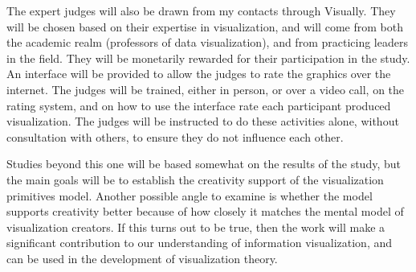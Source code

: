 The expert judges will also be drawn from my contacts through Visually.
They will be chosen based on their expertise in visualization, and will come from both the academic realm (professors of data visualization), and from practicing leaders in the field.
They will be monetarily rewarded for their participation in the study.
An interface will be provided to allow the judges to rate the graphics over the internet.
The judges will be trained, either in person, or over a video call, on the rating system, and on how to use the interface rate each participant produced visualization.
The judges will be instructed to do these activities alone, without consultation with others, to ensure they do not influence each other.

Studies beyond this one will be based somewhat on the results of the study, but the main goals will be to establish the creativity support of the visualization primitives model.
Another possible angle to examine is whether the model supports creativity better because of how closely it matches the mental model of visualization creators.
If this turns out to be true, then the work will make a significant contribution to our understanding of information visualization, and can be used in the development of visualization theory.